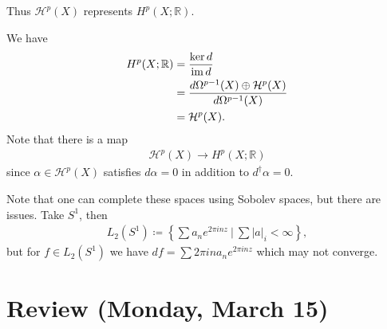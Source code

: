 \begin{corollary}[?]

Thus \(\mathcal{H}^p(X)\) represents \(H^p(X; {\mathbb{R}})\).

\end{corollary}

\begin{remark}

We have
\begin{align*}
H^p(X; {\mathbb{R}}) 
&= {\ker d \over \operatorname{im}d} \\
&= { d \Omega^{p-1}(X) \oplus \mathcal{H}^p(X) \over d \Omega^{p-1}(X) } \\
&= \mathcal{H}^p(X) 
.\end{align*}
Note that there is a map
\begin{align*}
\mathcal{H}^p(X) \to H^p(X; {\mathbb{R}}) 
\end{align*}
since \(\alpha\in \mathcal{H}^p(X)\) satisfies \(d \alpha = 0\) in
addition to \(d^\dagger \alpha = 0\).

\end{remark}

\begin{remark}

Note that one can complete these spaces using Sobolev spaces, but there
are issues. Take \(S^1\), then
\begin{align*}
L_2(S^1) \coloneqq\left\{{ \sum a_n e^{2\pi i n z} {~\mathrel{\Big|}~}\sum {\left\lvert {a} \right\rvert}_i < \infty  }\right\}
,\end{align*}
but for \(f\in L_2(S^1)\) we have
\(df = \sum 2\pi i n a_n e^{2\pi i n z}\) which may not converge.

\end{remark}

\hypertarget{review-monday-march-15}{%
\section{Review (Monday, March 15)}\label{review-monday-march-15}}

